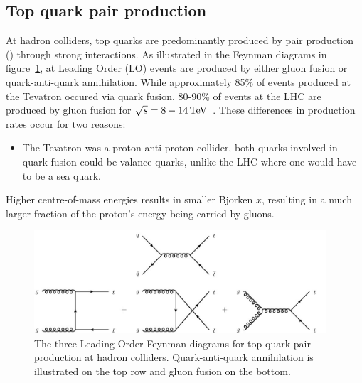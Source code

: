 
\subsection{Top quark pair production}\label{subsec:ttbarTheory}
At hadron colliders, top quarks are predominantly produced by pair production (\ttbar) through strong interactions.
As illustrated in the Feynman diagrams in figure~\ref{fig:feyn_ttbar}, at Leading Order (LO) \ttbar events are produced by either gluon fusion or quark-anti-quark annihilation. 
While approximately 85\% of \ttbar events produced at the Tevatron occured via quark fusion, 80-90\% of \ttbar events at the LHC are produced by gluon fusion for $\sqrt{s} = 8-14\,\text{Te\hspace{-.08em}V}$~\cite{Tanabashi:2018oca,Deliot:2011np}.
These differences in production rates occur for two reasons:
\begin{itemize}
\item The Tevatron was a proton-anti-proton collider, both quarks involved in quark fusion could be valance quarks, unlike the LHC where one would have to be a sea quark. 
\end{itemize} Higher centre-of-mass energies results in smaller Bjorken $x$, resulting in a much larger fraction of the proton's energy being carried by gluons.	 

\begin{figure}[htbp]
\begin{center}
\includegraphics[width=0.97\textwidth]{figs/top-physics/ttbar_feyn.jpg}
\caption{The three Leading Order Feynman diagrams for top quark pair production at hadron colliders. Quark-anti-quark annihilation is illustrated on the top row and gluon fusion on the bottom.}
\label{fig:feyn_ttbar}
\end{center}
\end{figure}

